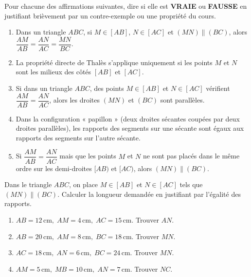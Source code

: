 \documentclass[11pt]{article}
\begin{document}
\begin{exercice}
Pour chacune des affirmations suivantes, dire si elle est \textbf{VRAIE} ou \textbf{FAUSSE} en justifiant brièvement par un contre-exemple ou une propriété du cours.
\begin{enumerate}
    \item Dans un triangle $ABC$, si $M \in [AB]$, $N \in [AC]$ et $(MN) \parallel (BC)$, alors $\dfrac{AM}{AB} = \dfrac{AN}{AC} = \dfrac{MN}{BC}$.
    \item La propriété directe de Thalès s'applique uniquement si les points $M$ et $N$ sont les milieux des côtés $[AB]$ et $[AC]$.
    \item Si dans un triangle $ABC$, des points $M \in [AB]$ et $N \in [AC]$ vérifient $\dfrac{AM}{AB} = \dfrac{AN}{AC}$, alors les droites $(MN)$ et $(BC)$ sont parallèles.
    \item Dans la configuration « papillon » (deux droites sécantes coupées par deux droites parallèles), les rapports des segments sur une sécante sont égaux aux rapports des segments sur l'autre sécante.
    \item Si $\dfrac{AM}{AB} = \dfrac{AN}{AC}$ mais que les points $M$ et $N$ ne sont pas placés dans le même ordre sur les demi-droites $[AB)$ et $[AC)$, alors $(MN) \parallel (BC)$.
\end{enumerate}
\end{exercice}

\begin{exercice}
Dans le triangle $ABC$, on place $M \in [AB]$ et $N \in [AC]$ tels que $(MN) \parallel (BC)$.
Calculer la longueur demandée en justifiant par l'égalité des rapports.
\begin{enumerate}
    \item $AB = 12\,\text{cm},\; AM = 4\,\text{cm},\; AC = 15\,\text{cm}$. Trouver $AN$.
    \item $AB = 20\,\text{cm},\; AM = 8\,\text{cm},\; BC = 18\,\text{cm}$. Trouver $MN$.
    \item $AC = 18\,\text{cm},\; AN = 6\,\text{cm},\; BC = 24\,\text{cm}$. Trouver $MN$.
    \item $AM = 5\,\text{cm},\; MB = 10\,\text{cm},\; AN = 7\,\text{cm}$. Trouver $NC$.
\end{enumerate}
\end{exercice}
\end{document}
